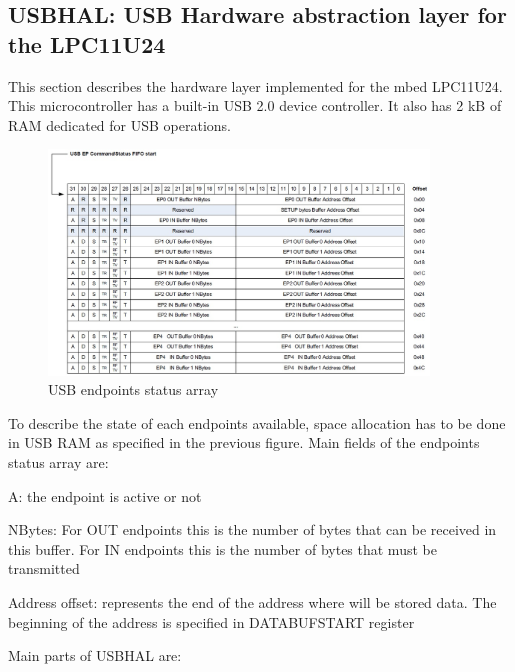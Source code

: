 \documentclass[pdftex,10pt,a4paper]{report}
\newenvironment{packed_item}{
\begin{itemize}
  \setlength{\itemsep}{1pt}
  \setlength{\parskip}{0pt}
  \setlength{\parsep}{0pt}
}{\end{itemize}}
\begin{document}
\subsection{USBHAL: USB Hardware abstraction layer for the LPC11U24}
This section describes the hardware layer implemented for the mbed LPC11U24. This microcontroller has a built-in USB 2.0 device controller. It also has 2 kB of RAM dedicated for USB operations.

\begin{figure}[h!]
		\centering
		\includegraphics[width=0.9\textwidth]{./usb_endpoints.jpg}
		\caption{USB endpoints status array}
		\label{USB endpoints status array}
\end{figure}

To describe the state of each endpoints available, space allocation has to be done in USB RAM as specified in the previous figure. Main fields of the endpoints status array are:
\begin{packed_item}
	\item A: the endpoint is active or not
	\item NBytes: For OUT endpoints this is the number of bytes that can be received in this buffer. For IN endpoints this is the number of bytes that must be transmitted
	\item Address offset: represents the end of the address where will be stored data. The beginning of the address is specified in DATABUFSTART register 
\end{packed_item}


Main parts of USBHAL are:
\end{document}

